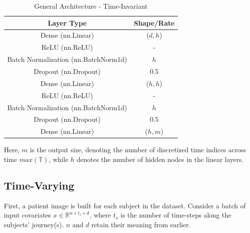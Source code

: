 \documentclass[%
 reprint,
 amsmath,amssymb,
 aps,nofootinbib
]{revtex4-2}
\begin{document}
\begin{table}[H]
  \centering
  \begin{tabular}{|c|c|}
    \hline
    \textbf{Layer Type} & \textbf{Shape/Rate} \\
    \hline
    Dense (nn.Linear) & ($d, h$) \\
    ReLU (nn.ReLU) & - \\
    Batch Normalization (nn.BatchNorm1d) & $h$ \\
    Dropout (nn.Dropout) & 0.5 \\ 
    Dense (nn.Linear) & ($h, h$) \\
    ReLU (nn.ReLU) & - \\
    Batch Normalization (nn.BatchNorm1d) & $h$ \\
    Dropout (nn.Dropout) & 0.5 \\
    Dense (nn.Linear) & ($h, m$) \\
    \hline
  \end{tabular}
  \caption{General Architecture - Time-Invariant}
  \label{tab:arch1}
\end{table}

Here, $m$ is the output size, denoting the number of discretized time indices across time $max(\mathbb{T})$, while $h$ denotes the number of hidden nodes in the linear layers.\\


\subsection{\label{time_var_arch}Time-Varying}
First, a patient image is built for each subject in the dataset. Consider a batch of input covariates $x \in \mathbb{R}^{n\times t_s \times d}$, where $t_s$ is the number of time-steps along the subjects' journey(s). $n$ and $d$ retain their meaning from earlier. \\
\end{document}
